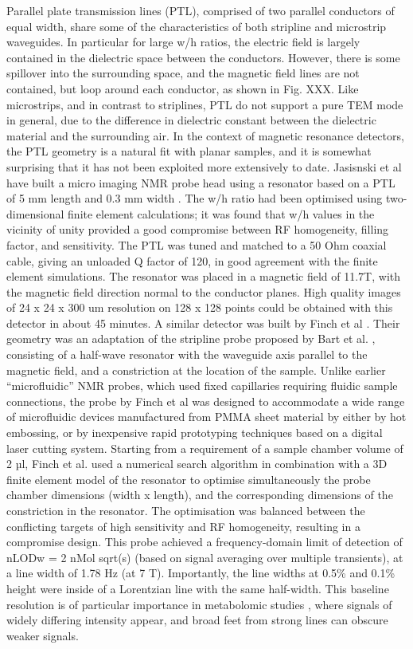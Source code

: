 Parallel plate transmission lines (PTL), comprised of two parallel
conductors of equal width, share some of the characteristics of both
stripline and microstrip waveguides. In particular for large w/h ratios,
the electric field is largely contained in the dielectric space between
the conductors. However, there is some spillover into the surrounding
space, and the magnetic field lines are not contained, but loop around
each conductor, as shown in Fig. XXX. Like microstrips, and in contrast
to striplines, PTL do not support a pure TEM mode in general, due to the
difference in dielectric constant between the dielectric material and
the surrounding air. In the context of magnetic resonance detectors, the
PTL geometry is a natural fit with planar samples, and it is somewhat
surprising that it has not been exploited more extensively to date.
Jasisnski et al have built a micro imaging NMR probe head using a
resonator based on a PTL of 5 mm length and 0.3 mm width
\cite{Jasinski:2012cn}. The w/h ratio had been optimised using
two-dimensional finite element calculations; it was found that w/h
values in the vicinity of unity provided a good compromise between RF
homogeneity, filling factor, and sensitivity. The PTL was tuned and
matched to a 50 Ohm coaxial cable, giving an unloaded Q factor of 120,
in good agreement with the finite element simulations. The resonator was
placed in a magnetic field of 11.7T, with the magnetic field direction
normal to the conductor planes. High quality images of 24 x 24 x 300 um
resolution on 128 x 128 points could be obtained with this detector in
about 45 minutes. A similar detector was built by Finch et al
\cite{Finch:2016gv}. Their geometry was an adaptation of the stripline
probe proposed by Bart et al. \cite{Bart:2009kc}, consisting of a half-wave
resonator with the waveguide axis parallel to the magnetic field, and a
constriction at the location of the sample. Unlike earlier
``microfluidic'' NMR probes, which used fixed capillaries requiring
fluidic sample connections, the probe by Finch et al was designed to
accommodate a wide range of microfluidic devices manufactured from PMMA
sheet material by either by hot embossing, or by inexpensive rapid
prototyping techniques based on a digital laser cutting system. Starting
from a requirement of a sample chamber volume of 2 µl, Finch et al. used
a numerical search algorithm in combination with a 3D finite element
model of the resonator to optimise simultaneously the probe chamber
dimensions (width x length), and the corresponding dimensions of the
constriction in the resonator. The optimisation was balanced between the
conflicting targets of high sensitivity and RF homogeneity, resulting in
a compromise design. This probe achieved a frequency-domain limit of
detection of nLODw = 2 nMol sqrt(s) (based on signal averaging over
multiple transients), at a line width of 1.78 Hz (at 7 T). Importantly,
the line widths at 0.5\% and 0.1\% height were inside of a Lorentzian
line with the same half-width. This baseline resolution is of particular
importance in metabolomic studies \cite{Pan:2007uk,Zhang2010kf}, where
signals of widely differing intensity appear, and broad feet from strong
lines can obscure weaker signals. 

